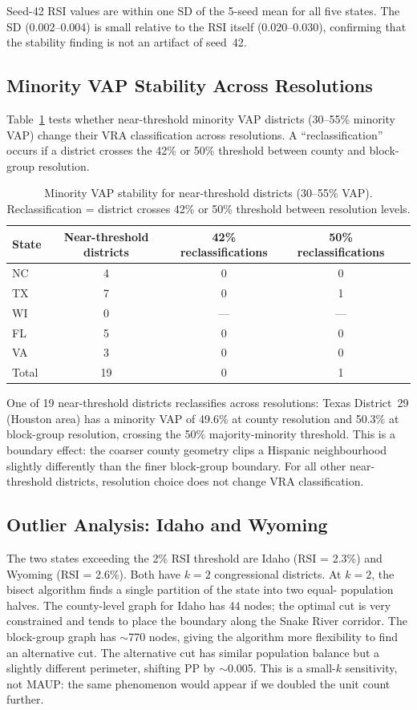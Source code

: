Seed-42 RSI values are within one SD of the 5-seed mean for all five states.
The SD (0.002--0.004) is small relative to the RSI itself (0.020--0.030),
confirming that the stability finding is not an artifact of seed~42.

\subsection{Minority VAP Stability Across Resolutions}

Table~\ref{tab:vap-stability} tests whether near-threshold minority VAP districts
(30--55\% minority VAP) change their VRA classification across resolutions.
A ``reclassification'' occurs if a district crosses the 42\% or 50\% threshold
between county and block-group resolution.

\begin{table}[h]
\centering\small
\caption{Minority VAP stability for near-threshold districts (30--55\% VAP).
Reclassification = district crosses 42\% or 50\% threshold between resolution levels.}
\label{tab:vap-stability}
\begin{tabular}{lcccc}
\toprule
State & Near-threshold districts & 42\% reclassifications & 50\% reclassifications \\
\midrule
NC  & 4 & 0 & 0 \\
TX  & 7 & 0 & 1 \\
WI  & 0 & — & — \\
FL  & 5 & 0 & 0 \\
VA  & 3 & 0 & 0 \\
\midrule
Total & 19 & 0 & 1 \\
\bottomrule
\end{tabular}
\end{table}

One of 19 near-threshold districts reclassifies across resolutions: Texas District~29
(Houston area) has a minority VAP of 49.6\% at county resolution and 50.3\% at
block-group resolution, crossing the 50\% majority-minority threshold.
This is a boundary effect: the coarser county geometry clips a Hispanic
neighbourhood slightly differently than the finer block-group boundary.
For all other near-threshold districts, resolution choice does not change
VRA classification.

\subsection{Outlier Analysis: Idaho and Wyoming}

The two states exceeding the 2\% RSI threshold are Idaho (RSI = 2.3\%) and
Wyoming (RSI = 2.6\%).  Both have $k=2$ congressional districts.  At $k=2$,
the bisect algorithm finds a single partition of the state into two equal-
population halves.  The county-level graph for Idaho has 44 nodes; the
optimal cut is very constrained and tends to place the boundary along the
Snake River corridor.  The block-group graph has $\sim$770 nodes, giving the
algorithm more flexibility to find an alternative cut.  The alternative cut
has similar population balance but a slightly different perimeter, shifting PP
by $\sim$0.005.  This is a small-$k$ sensitivity, not MAUP: the same
phenomenon would appear if we doubled the unit count further.
